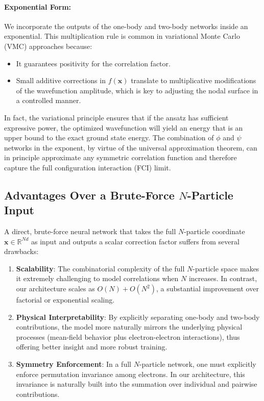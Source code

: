 \paragraph{Exponential Form:}  
We incorporate the outputs of the one-body and two-body networks inside an exponential. This multiplication rule is common in variational Monte Carlo (VMC) approaches because:
\begin{itemize}
  \item It guarantees positivity for the correlation factor.
  \item Small additive corrections in \(f(\mathbf{x})\) translate to multiplicative modifications of the wavefunction amplitude, which is key to adjusting the nodal surface in a controlled manner.
\end{itemize}
In fact, the variational principle ensures that if the ansatz has sufficient expressive power, the optimized wavefunction will yield an energy that is an upper bound to the exact ground state energy. The combination of \(\phi\) and \(\psi\) networks in the exponent, by virtue of the universal approximation theorem, can in principle approximate any symmetric correlation function and therefore capture the full configuration interaction (FCI) limit.

\subsection{Advantages Over a Brute-Force \(N\)-Particle Input}

A direct, brute-force neural network that takes the full \(N\)-particle coordinate \(\mathbf{x} \in \mathbb{R}^{Nd}\) as input and outputs a scalar correction factor suffers from several drawbacks:
\begin{enumerate}
  \item \textbf{Scalability}: The combinatorial complexity of the full \(N\)-particle space makes it extremely challenging to model correlations when \(N\) increases. In contrast, our architecture scales as \(O(N) + O(N^2)\), a substantial improvement over factorial or exponential scaling.
  \item \textbf{Physical Interpretability}: By explicitly separating one-body and two-body contributions, the model more naturally mirrors the underlying physical processes (mean-field behavior plus electron-electron interactions), thus offering better insight and more robust training.
  \item \textbf{Symmetry Enforcement}: In a full \(N\)-particle network, one must explicitly enforce permutation invariance among electrons. In our architecture, this invariance is naturally built into the summation over individual and pairwise contributions.
\end{enumerate}

